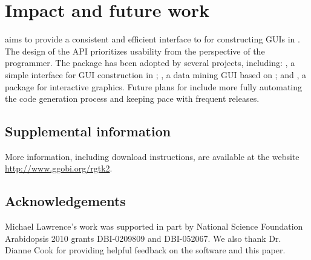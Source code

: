 \documentclass[article,shortnames]{jss}
\begin{document}
\section{Impact and future work}

 aims to provide a consistent and efficient interface to
for constructing GUIs in . The design of the API
prioritizes
usability from the perspective of the  programmer.
The package has been adopted by several projects, including:
\citep{gWidgets}, a simple interface for GUI construction in
; 
 \citep{rattle}, a data mining GUI based on
; and 
 \citep{playwith}, a package for interactive
graphics. Future plans for  include more fully automating
the code 
generation process and keeping pace with frequent  releases.

\subsection*{Supplemental information}

More information, including download instructions,
are available at the  website
\url{http://www.ggobi.org/rgtk2}.

\subsection*{Acknowledgements}

Michael Lawrence's work was supported in part by National Science
Foundation Arabidopsis 2010 grants DBI-0209809 and DBI-052067. We also
thank Dr. Dianne Cook for providing helpful feedback on the software
and this paper.

%







\end{document}
